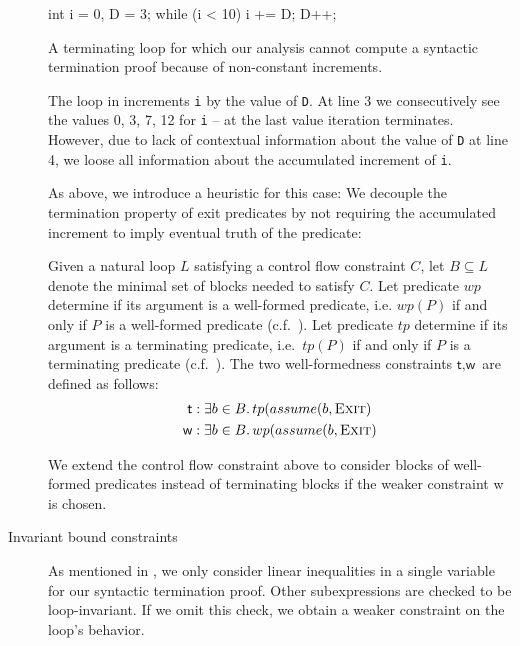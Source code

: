 \begin{description}
\begin{listing}
\begin{ccode}
int i = 0,
    D = 3;
while (i < 10) {
    i += D;
    D++;
}
\end{ccode}
\caption{A terminating loop for which our analysis cannot compute a syntactic termination proof because of non-constant increments.}
\label{lst:terminating_not_synt2}
\end{listing}

        \begin{example}
            The loop in  increments \texttt{i} by the value of \texttt{D}. At line 3 we consecutively see the values 0, 3, 7, 12 for \texttt{i} -- at the last value iteration terminates. However, due to lack of contextual information about the value of \texttt{D} at line 4, we loose all information about the accumulated increment of \texttt{i}.
        \end{example}
        As above, we introduce a heuristic for this case: We decouple the termination property of exit predicates by not requiring the accumulated increment to imply eventual truth of the predicate:
    \begin{definition}
        Given a natural loop $L$ satisfying a control flow constraint $C$, let $B \subseteq L$ denote the minimal set of blocks needed to satisfy $C$. Let predicate $wp$ determine if its argument is a well-formed predicate, i.e. $wp(P)$ if and only if $P$ is a well-formed predicate (c.f.\ ). Let predicate $tp$ determine if its argument is a terminating predicate, i.e.\ $tp(P)$ if and only if $P$ is a terminating predicate (c.f.\ ). The two well-formedness constraints $\textsf{t}, \textsf{w}$ are defined as follows:
    \begin{align*}
        \textsf{t}&: \exists b \in B \ldotp tp(assume(b, \textsc{Exit}) \\
        \textsf{w}&: \exists b \in B \ldotp wp(assume(b, \textsc{Exit}) \\
    \end{align*}
    \end{definition}
    We extend the control flow constraint above to consider blocks of well-formed predicates instead of terminating blocks if the weaker constraint \textsf{w} is chosen.
    \item[Invariant bound constraints] As mentioned in , we only consider linear inequalities in a single variable for our syntactic termination proof. Other subexpressions are checked to be loop-invariant. If we omit this check, we obtain a weaker constraint on the loop's behavior.

\end{description}
